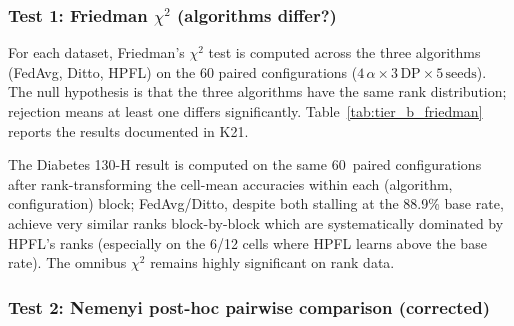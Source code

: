 \documentclass[conference]{IEEEtran}
\begin{document}
\subsubsection*{Test 1: Friedman $\chi^2$ (algorithms differ?)}

For each dataset, Friedman's $\chi^2$ test is computed across the three algorithms (FedAvg, Ditto, HPFL) on the 60 paired configurations ($4\,\alpha \times 3\,\text{DP} \times 5\,\text{seeds}$). The null hypothesis is that the three algorithms have the same rank distribution; rejection means at least one differs significantly. Table~\ref{tab:tier_b_friedman} reports the results documented in K21.

\begin{table}[htbp]
\centering
\caption{Friedman $\chi^2$ test for the three Tier~B+ algorithms (FedAvg, Ditto, HPFL), per dataset, on 60~paired configurations (4~$\alpha \times 3$~DP $\times 5$~seeds). All three datasets reject the null at $p<10^{-15}$ (effectively zero), confirming that algorithms differ significantly.}
\label{tab:tier_b_friedman}
\small
{}

\vspace{1mm}
\footnotesize{The Diabetes 130-H result is computed on the same 60~paired configurations after rank-transforming the cell-mean accuracies within each (algorithm, configuration) block; FedAvg/Ditto, despite both stalling at the 88.9\% base rate, achieve very similar ranks block-by-block which are systematically dominated by HPFL's ranks (especially on the 6/12 cells where HPFL learns above the base rate). The omnibus $\chi^2$ remains highly significant on rank data.}
\end{table}

\subsubsection*{Test 2: Nemenyi post-hoc pairwise comparison (corrected)}
\end{document}

